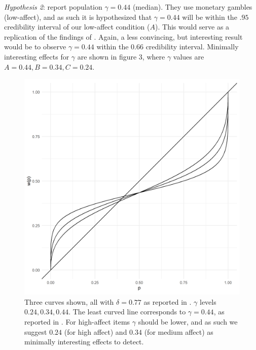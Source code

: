 \documentclass[12pt]{article}
\begin{document}
\emph{Hypothesis 2}: \textcite{gonzalez1999shape} report
population $\gamma = 0.44$ (median).
They use monetary gambles (low-affect),
and as such it is hypothesized that
$\gamma = 0.44$ will be within the  $.95$
credibility interval of our low-affect
condition ($A$). This would serve as
a replication of the findings of
\textcite{gonzalez1999shape}. Again, a
less convincing, but interesting result would
be to observe $\gamma = 0.44$ within the
 $0.66$ credibility interval. Minimally
interesting effects for $\gamma$ are
shown in figure 3, where  $\gamma$
values are  $A = 0.44, B = 0.34, C = 0.24$.

\begin{figure}[H]
	\includegraphics[width = \linewidth]{../Figures/ourHyp.png}
	\caption{Three curves shown, all with $\delta = 0.77$
	as reported in \textcite{gonzalez1999shape}.
	$\gamma$ levels $0.24, 0.34, 0.44$. The
	least curved line corresponds to $\gamma = 0.44$,
	as reported in \textcite{gonzalez1999shape}.
	For high-affect items $\gamma$ should
	be lower, and as such we suggest $0.24$
	(for high affect) and  $0.34$ (for medium
	affect) as minimally interesting effects
to detect.}
\end{figure}
\end{document}
